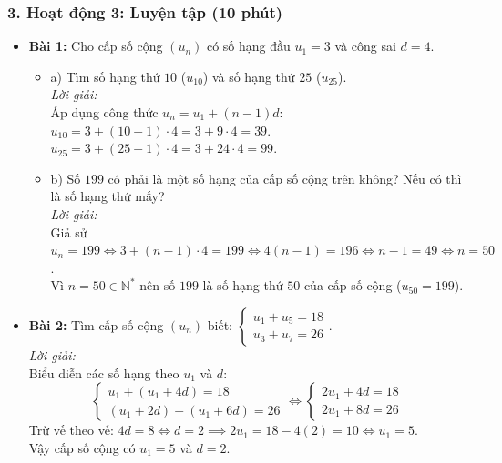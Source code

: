 \documentclass[12pt, a4paper]{article}
\begin{document}
\subsubsection*{3. Hoạt động 3: Luyện tập (10 phút)}
\begin{itemize}
    \item \textbf{Bài 1:} Cho cấp số cộng $(u_n)$ có số hạng đầu $u_1 = 3$ và công sai $d = 4$.
    \begin{itemize}
        \item a) Tìm số hạng thứ $10$ ($u_{10}$) và số hạng thứ $25$ ($u_{25}$).\\
        \textit{Lời giải:}\\
        Áp dụng công thức $u_n = u_1 + (n - 1)d$:\\
        $u_{10} = 3 + (10 - 1) \cdot 4 = 3 + 9 \cdot 4 = 39$.\\
        $u_{25} = 3 + (25 - 1) \cdot 4 = 3 + 24 \cdot 4 = 99$.
        \item b) Số $199$ có phải là một số hạng của cấp số cộng trên không? Nếu có thì là số hạng thứ mấy?\\
        \textit{Lời giải:}\\
        Giả sử $u_n = 199 \iff 3 + (n - 1) \cdot 4 = 199 \iff 4(n - 1) = 196 \iff n - 1 = 49 \iff n = 50$.\\
        Vì $n = 50 \in \mathbb{N}^*$ nên số $199$ là số hạng thứ $50$ của cấp số cộng ($u_{50} = 199$).
    \end{itemize}
    \item \textbf{Bài 2:} Tìm cấp số cộng $(u_n)$ biết: $\begin{cases} u_1 + u_5 = 18 \\ u_3 + u_7 = 26 \end{cases}$.\\
    \textit{Lời giải:}\\
    Biểu diễn các số hạng theo $u_1$ và $d$:
    $$\begin{cases} u_1 + (u_1 + 4d) = 18 \\ (u_1 + 2d) + (u_1 + 6d) = 26 \end{cases} \iff \begin{cases} 2u_1 + 4d = 18 \\ 2u_1 + 8d = 26 \end{cases}$$
    Trừ vế theo vế: $4d = 8 \iff d = 2 \implies 2u_1 = 18 - 4(2) = 10 \iff u_1 = 5$.\\
    Vậy cấp số cộng có $u_1 = 5$ và $d = 2$.
\end{itemize}
\end{document}
